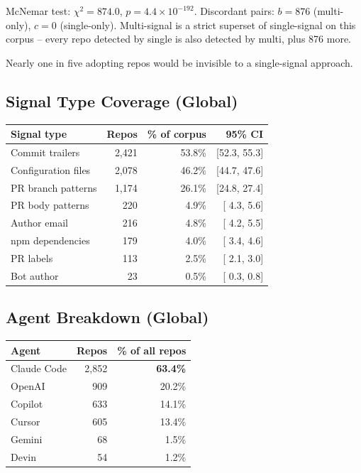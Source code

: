 \documentclass[12pt,a4paper]{article}
\begin{document}
McNemar test: $\chi^2 = 874.0$, $p = 4.4 \times 10^{-192}$. Discordant pairs: $b = 876$ (multi-only), $c = 0$ (single-only). Multi-signal is a strict superset of single-signal on this corpus -- every repo detected by single is also detected by multi, plus 876 more.

Nearly one in five adopting repos would be invisible to a single-signal approach.

\subsection{Signal Type Coverage (Global)}

\begin{table}[h]
\centering
\begin{tabular}{@{}lrrr@{}}
\toprule
Signal type & Repos & \% of corpus & 95\% CI \\
\midrule
Commit trailers     & 2,421 & 53.8\% & [52.3, 55.3] \\
Configuration files & 2,078 & 46.2\% & [44.7, 47.6] \\
PR branch patterns  & 1,174 & 26.1\% & [24.8, 27.4] \\
PR body patterns    &   220 &  4.9\% & [ 4.3,  5.6] \\
Author email        &   216 &  4.8\% & [ 4.2,  5.5] \\
npm dependencies    &   179 &  4.0\% & [ 3.4,  4.6] \\
PR labels           &   113 &  2.5\% & [ 2.1,  3.0] \\
Bot author          &    23 &  0.5\% & [ 0.3,  0.8] \\
\bottomrule
\end{tabular}
\end{table}

\subsection{Agent Breakdown (Global)}

\begin{table}[h]
\centering
\begin{tabular}{@{}lrr@{}}
\toprule
Agent & Repos & \% of all repos \\
\midrule
Claude Code & 2,852 & \textbf{63.4\%} \\
OpenAI      &   909 & 20.2\% \\
Copilot     &   633 & 14.1\% \\
Cursor      &   605 & 13.4\% \\
Gemini      &    68 &  1.5\% \\
Devin       &    54 &  1.2\% \\
\bottomrule
\end{tabular}
\end{table}
\end{document}
